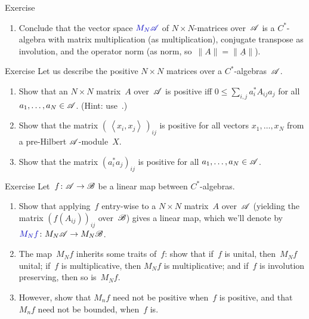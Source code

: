 \documentclass[a]{subfiles}
\begin{document}
\begin{parsec}
\begin{point}{Exercise}
\begin{enumerate}
\item
Conclude that the vector space $\Define{M_N\scrA}$%
of $N\times N$-matrices over~$\mathscr{A}$
is a $C^*$-algebra
with matrix multiplication (as multiplication),
conjugate transpose as involution,
and the operator norm (as norm, so~$\|A\|=\|\underline{A}\|$).
\end{enumerate}
\end{point}
\begin{point}{Exercise}%
Let us describe the positive  $N\times N$ matrices
over a $C^*$-algebras~$\mathscr{A}$.
\begin{enumerate}
\item
Show that an $N\times N$ matrix~$A$ over~$\mathscr{A}$
is positive iff $0\leq \sum_{i,j} a_i^* A_{ij} a_j$
for all~$a_1,\dotsc,a_N\in\mathscr{A}$.
(Hint: use~.)
\item
Show that the matrix $(\,\left<x_i,x_j\right>\,)_{ij}$
is positive for all vectors $x_1,\dotsc,x_N$
from a pre-Hilbert $\mathscr{A}$-module~$X$.
\item
Show that the matrix $(a^*_ia_j)_{ij}$
is positive for all $a_1,\dotsc,a_N\in\mathscr{A}$.
\end{enumerate}
\end{point}
\begin{point}[mnf]{Exercise}%
Let~$f\colon \mathscr{A}\to\mathscr{B}$ be a linear map between $C^*$-algebras.
\begin{enumerate}
\item
Show that applying~$f$ entry-wise to a $N\times N$ matrix~$A$
over~$\mathscr{A}$ (yielding the matrix $(f(A_{ij}))_{ij}$ over~$\mathscr{B}$)
gives a linear map,
which we'll denote by~$\Define{M_Nf}\colon M_N\scrA\to M_N\scrB$.%
\item
The map~$M_Nf$ inherits some traits of~$f$:
show that if~$f$ is unital, then~$M_Nf$ unital;
if~$f$ is multiplicative, then $M_Nf$ is multiplicative; and
if~$f$ is involution preserving, then so is~$M_Nf$.
\item
However,
show that $M_nf$ need not be positive when~$f$ is positive,
and that~$M_nf$ need not be bounded, when~$f$ is.
\end{enumerate}
\end{point}
\end{parsec}
\end{document}
